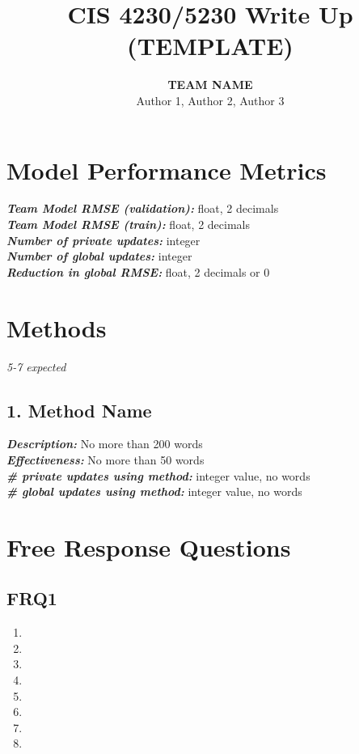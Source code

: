 \documentclass[a4paper,10pt]{article}
\begin{document}
\title{CIS 4230/5230 Write Up (TEMPLATE)}
\author{
\textbf{TEAM NAME }\\
Author 1, Author 2, Author 3
}
\date{}
\maketitle
\section*{Model Performance Metrics}
\textbf{\textit{Team Model RMSE (validation):}} 
float, 2 decimals
\medskip\\
\textbf{\textit{Team Model RMSE (train):}} 
float, 2 decimals
\medskip\\
\textbf{\textit{Number of private updates:}} 
integer
\medskip\\
\textbf{\textit{Number of global updates:}} 
integer
\medskip\\
\textbf{\textit{Reduction in global RMSE:}} 
float, 2 decimals or 0

\section*{Methods}
\textit{5-7 expected}
\subsection*{1. Method Name}
\textit{\textbf{Description:}} 
No more than 200 words
\medskip\\
\textit{\textbf{Effectiveness:}} 
No more than 50 words
\medskip\\
\textit{\textbf{\# private updates using method:}} 
integer value, no words
\medskip\\
\textit{\textbf{\# global updates using method:}} 
integer value, no words

\section*{Free Response Questions}

\subsection*{FRQ1}
\begin{enumerate}
    \item  %
    \item  %
    \item  %
    \item  %
    \item  %
    \item  %
    \item  %
    \item  %
\end{enumerate}
\end{document}
